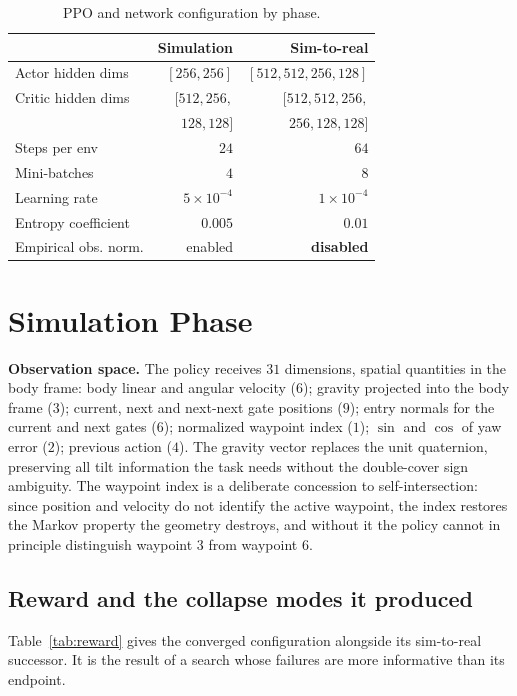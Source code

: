 \documentclass[10pt, twocolumn]{article}
\begin{document}
\begin{table}[t]
\centering
\footnotesize
\caption{PPO and network configuration by phase.}
\label{tab:ppo}
\begin{tabular}{@{}l r r@{}}
\toprule
& Simulation & Sim-to-real \\
\midrule
Actor hidden dims    & $[256,256]$ & $[512,512,256,128]$ \\
Critic hidden dims   & $[512,256,$ & $[512,512,256,$ \\
                     & $128,128]$  & $256,128,128]$ \\
Steps per env        & $24$ & $64$ \\
Mini-batches         & $4$ & $8$ \\
Learning rate        & $5\!\times\!10^{-4}$ & $1\!\times\!10^{-4}$ \\
Entropy coefficient  & $0.005$ & $0.01$ \\
Empirical obs. norm. & enabled & \textbf{disabled} \\
\bottomrule
\end{tabular}
\end{table}

\section{Simulation Phase}

\textbf{Observation space.} The policy receives $31$ dimensions, spatial
quantities in the body frame: body linear and angular velocity ($6$); gravity
projected into the body frame ($3$); current, next and next-next gate positions
($9$); entry normals for the current and next gates ($6$); normalized waypoint
index ($1$); $\sin$ and $\cos$ of yaw error ($2$); previous action ($4$). The
gravity vector replaces the unit quaternion, preserving all tilt information
the task needs without the double-cover sign ambiguity. The waypoint index is a
deliberate concession to self-intersection: since position and velocity do not
identify the active waypoint, the index restores the Markov property the
geometry destroys, and without it the policy cannot in principle distinguish
waypoint 3 from waypoint 6.

\subsection{Reward and the collapse modes it produced}
\label{sec:sim-reward}

Table~\ref{tab:reward} gives the converged configuration alongside its
sim-to-real successor. It is the result of a search whose failures are more
informative than its endpoint.
\end{document}
